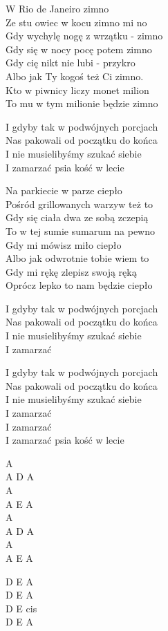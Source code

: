 \begin{text}
    W Rio de Janeiro zimno\\
    Ze stu owiec w kocu zimno mi no\\
    Gdy wychylę nogę z wrzątku - zimno\\
    Gdy się w nocy pocę potem zimno\\
    Gdy cię nikt nie lubi - przykro\\
    Albo jak Ty kogoś też Ci zimno.\\
    Kto w piwnicy liczy monet milion\\
    To mu w tym milionie będzie zimno

    I gdyby tak w podwójnych porcjach\\
    Nas pakowali od początku do końca\\
    I nie musielibyśmy szukać siebie\\
    I zamarzać psia kość w lecie

    Na parkiecie w parze ciepło\\
    Pośród grillowanych warzyw też to\\
    Gdy się ciała dwa ze sobą zczepią\\
    To w tej sumie sumarum na pewno\\
    Gdy mi mówisz miło ciepło\\
    Albo jak odwrotnie tobie wiem to\\
    Gdy mi rękę zlepisz swoją ręką\\
    Oprócz lepko to nam będzie ciepło

    I gdyby tak w podwójnych porcjach\\
    Nas pakowali od początku do końca\\
    I nie musielibyśmy szukać siebie\\
    I zamarzać

    I gdyby tak w podwójnych porcjach\\
    Nas pakowali od początku do końca\\
    I nie musielibyśmy szukać siebie\\
    I zamarzać\\
    I zamarzać\\
    I zamarzać psia kość w lecie
\end{text}
\begin{chord}
    A\\
    A D A\\
    A\\
    A E A\\
    A\\
    A D A\\
    A\\
    A E A

    D E A\\
    D E A\\
    D E cis\\
    D E A
\end{chord}